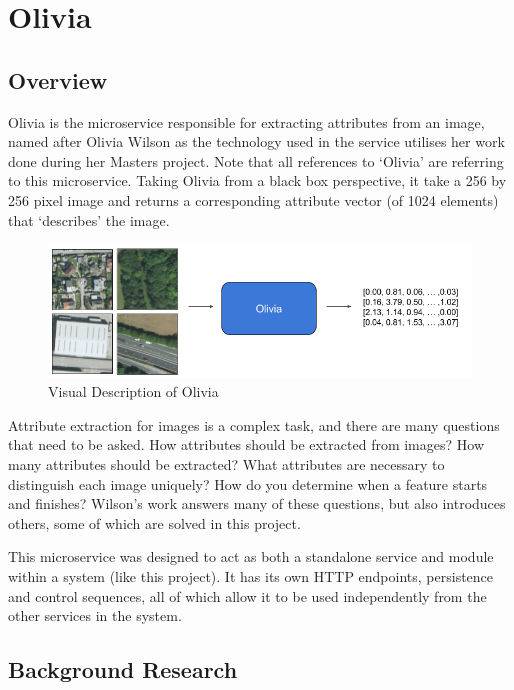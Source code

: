 \chapter{Olivia} \label{chapter:Olivia}

\section{Overview}
Olivia is the microservice responsible for extracting attributes from an image, named after Olivia Wilson as the technology used in the service utilises her work done during her Masters project. Note that all references to ‘Olivia’ are referring to this microservice. Taking Olivia from a black box perspective, it take a 256 by 256 pixel image and returns a corresponding attribute vector (of 1024 elements) that `describes’ the image. 


\begin{figure}[H]
    \centering
    \includegraphics[width=\textwidth]{figs/7/olivia-goal}
    \caption{Visual Description of Olivia}
    \label{fig:basic_olivia}
\end{figure}


Attribute extraction for images is a complex task, and there are many questions that need to be asked. How attributes should be extracted from images? How many attributes should be extracted? What attributes are necessary to distinguish each image uniquely? How do you determine when a feature starts and finishes? Wilson’s work answers many of these questions, but also introduces others, some of which are solved in this project. 

This microservice was designed to act as both a standalone service and module within a system (like this project). It has its own HTTP endpoints, persistence and control sequences, all of which allow it to be used independently from the other services in the system.


\section{Background Research}

